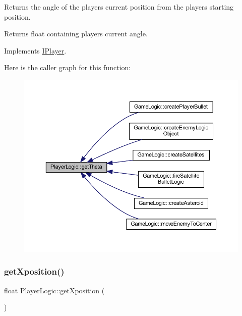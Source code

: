 Returns the angle of the player\textquotesingle{}s current position from the players starting position. 

\begin{DoxyReturn}{Returns}
float containing players current angle. 
\end{DoxyReturn}


Implements \hyperlink{class_i_player_a05103e6bebfd4230bab62d112c7e4eec}{I\+Player}.

Here is the caller graph for this function\+:\nopagebreak
\begin{figure}[H]
\begin{center}
\leavevmode
\includegraphics[width=350pt]{class_player_logic_a7ea2f59ddde028b5451ddbe60453de1c_icgraph}
\end{center}
\end{figure}
\mbox{\label{class_player_logic_a9f92defe2d43690329bd6e334fb61e01}} 
\subsubsection{\texorpdfstring{get\+Xposition()}{getXposition()}}
{\footnotesize\ttfamily float Player\+Logic\+::get\+Xposition (\begin{DoxyParamCaption}{ }\end{DoxyParamCaption})\hspace{0.3cm}{\ttfamily [virtual]}}



